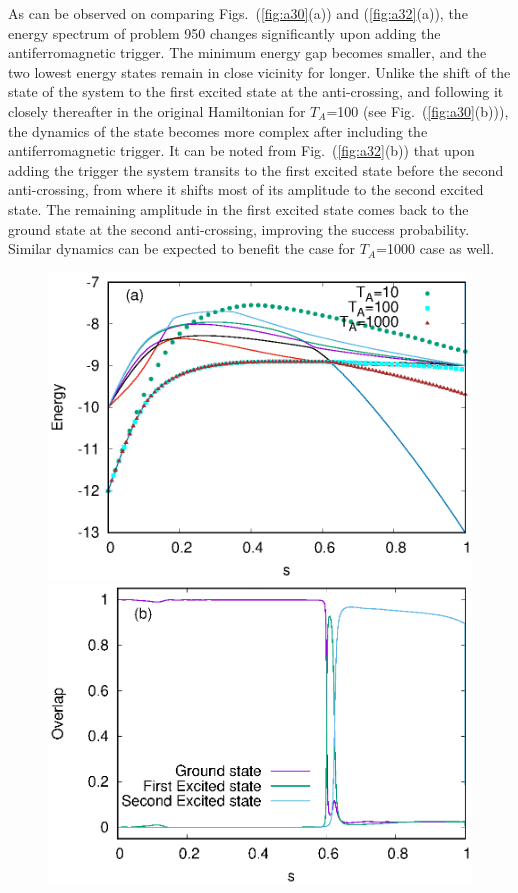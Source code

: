 \documentclass[../main.tex]{subfiles}
\begin{document}
\begin{itemize}
As can be observed on comparing Figs.~(\ref{fig:a30}(a)) and (\ref{fig:a32}(a)), the energy spectrum of problem 950 changes significantly upon adding the antiferromagnetic trigger. The minimum energy gap becomes smaller, and the two lowest energy states remain in close vicinity for longer. Unlike the shift of the state of the system to the first excited state at the anti-crossing, and following it closely thereafter in the original Hamiltonian for $T_A$=100 (see Fig.~(\ref{fig:a30}(b))), the dynamics of the state becomes more complex after including the antiferromagnetic trigger. It can be noted from Fig.~(\ref{fig:a32}(b)) that upon adding the trigger the system transits to the first excited state before the second anti-crossing, from where it shifts most of its amplitude to the second excited state. The remaining amplitude in the first excited state comes back to the ground state at the second anti-crossing, improving the success probability. Similar dynamics can be expected to benefit the case for $T_A$=1000 case as well.
\begin{figure}
\centering
  \includegraphics[scale=0.8]{950a_s12_A_g1.eps}
  \includegraphics[scale=0.8]{950_A_g1_Overlap.eps}

\end{figure}
\end{itemize}
\end{document}
